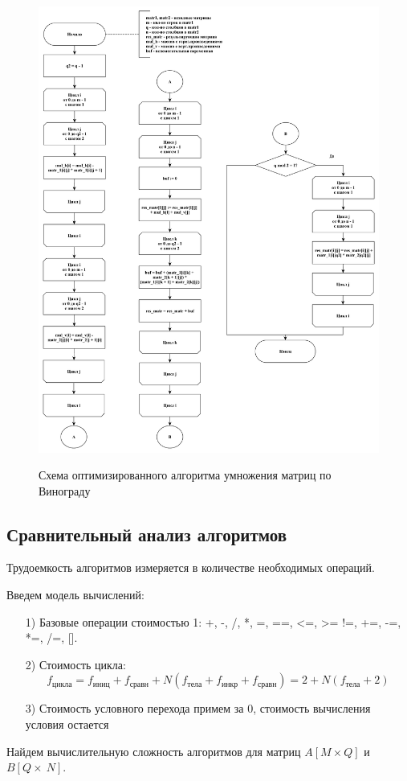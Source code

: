 \documentclass[a4paper,12pt]{article}
\begin{document}
	    
	    \begin{figure}[h!]
	    	\begin{center}
	    		{\includegraphics[scale = 0.42]{schema03.pdf}}
	    		\caption{Схема оптимизированного алгоритма умножения матриц по Винограду}
	    		\label{fig:schema_mult_vin_opt}
	    	\end{center}
	    \end{figure}
	    
	 	\newpage
		\mbox{}
		\newpage
		\mbox{}
		\newpage
	    
		\subsection{Сравнительный анализ алгоритмов}
	 \label{fig:an_alg}
		Трудоемкость алгоритмов измеряется в количестве необходимых операций.
		
		Введем модель вычислений:
		\begin{enumerate}
		\item[1)] Базовые операции стоимостью 1: +, -, /, *, =, ==, <=, >= !=, +=, -=, *=, /=, [\:].
		\item[2)] Стоимость цикла:
		\[
		f_{\text{цикла}} = f_{\text{иниц}} + f_{\text{сравн}} + N(f_{\text{тела}} + f_{\text{инкр}} + f_{\text{сравн}}) = 2 + N(f_{\text{тела}} + 2)
		\]
		\item[3)]  Стоимость условного перехода примем за 0, стоимость вычисления условия остается
		
		\end{enumerate}
		Найдем вычислительную сложность алгоритмов для матриц $A[M \times Q]$ и $B[Q \times ~N]$.
\end{document}
